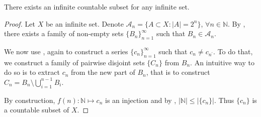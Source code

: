 \begin{theorem}
    There exists an infinite countable subset for any infinite set.
\end{theorem}
\begin{proof}
    Let $X$ be an infinite set. Denote $\mathcal{A}_n=\{A \subset X : |A| = 2^n\}$, $\forall n \in \mathbb{N}$. By , there exists a family of 
    non-empty sets $\{B_n\}_{n=1}^{\infty}$ such that $B_n \in \mathcal{A}_n$. 

    We now use , again to construct a series $\{c_n\}_{n=1}^{\infty}$ such that $c_n \neq c_{n^{\prime}}$. To do that, we construct a family of pairwise disjoint sets $\{C_n\}$ from $B_n$.
    An intuitive way to do so is to extract $c_n$ from the new part of $B_n$, that is to construct $C_n = B_n \setminus \bigcup_{i=1}^{n-1} B_i$.

    By construction, $f(n):\mathbb{N}\mapsto c_n$ is an injection and by , $|\mathbb{N}|\leq |\{c_n\}|$. Thus $\{c_n\}$ is a countable subset of $X$.
\end{proof}

